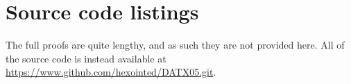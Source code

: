 \chapter{Source code listings}

	The full proofs are quite lengthy, and as such they are not provided here.
	All of the source code is instead available at
	\url{https://www.github.com/hexointed/DATX05.git}.
